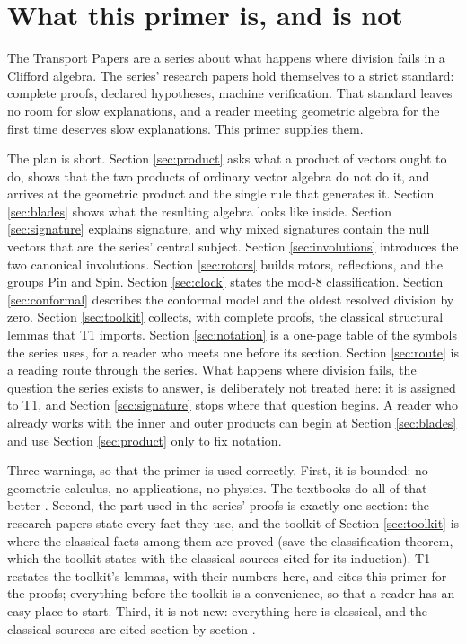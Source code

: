 \documentclass[11pt]{article}
\theoremstyle{plain}
\theoremstyle{definition}
\newcommand{\Pin}{\mathrm{Pin}}
\newcommand{\Spin}{\mathrm{Spin}}
\begin{document}
\newpage
\section{What this primer is, and is not}\label{sec:scope}

The Transport Papers are a series about what happens where division fails in a Clifford algebra. The series' research papers hold themselves to a strict standard: complete proofs, declared hypotheses, machine verification. That standard leaves no room for slow explanations, and a reader meeting geometric algebra for the first time deserves slow explanations. This primer supplies them.

The plan is short. Section \ref{sec:product} asks what a product of vectors ought to do, shows that the two products of ordinary vector algebra do not do it, and arrives at the geometric product and the single rule that generates it. Section \ref{sec:blades} shows what the resulting algebra looks like inside. Section \ref{sec:signature} explains signature, and why mixed signatures contain the null vectors that are the series' central subject. Section \ref{sec:involutions} introduces the two canonical involutions. Section \ref{sec:rotors} builds rotors, reflections, and the groups $\Pin$ and $\Spin$. Section \ref{sec:clock} states the mod-8 classification. Section \ref{sec:conformal} describes the conformal model and the oldest resolved division by zero. Section \ref{sec:toolkit} collects, with complete proofs, the classical structural lemmas that T1 \cite{ButlerT1} imports. Section \ref{sec:notation} is a one-page table of the symbols the series uses, for a reader who meets one before its section. Section \ref{sec:route} is a reading route through the series. What happens where division fails, the question the series exists to answer, is deliberately not treated here: it is assigned to T1, and Section \ref{sec:signature} stops where that question begins. A reader who already works with the inner and outer products can begin at Section \ref{sec:blades} and use Section \ref{sec:product} only to fix notation.

Three warnings, so that the primer is used correctly. First, it is bounded: no geometric calculus, no applications, no physics. The textbooks do all of that better \cite{Macdonald2010, DoranLasenby2003, DFM2007, HestenesSobczyk1984}. Second, the part used in the series' proofs is exactly one section: the research papers state every fact they use, and the toolkit of Section \ref{sec:toolkit} is where the classical facts among them are proved (save the classification theorem, which the toolkit states with the classical sources cited for its induction). T1 restates the toolkit's lemmas, with their numbers here, and cites this primer for the proofs; everything before the toolkit is a convenience, so that a reader has an easy place to start. Third, it is not new: everything here is classical, and the classical sources are cited section by section \cite{Porteous1995, Lounesto2001, Lam2005, Chevalley1997, ABS1964}.
\end{document}
